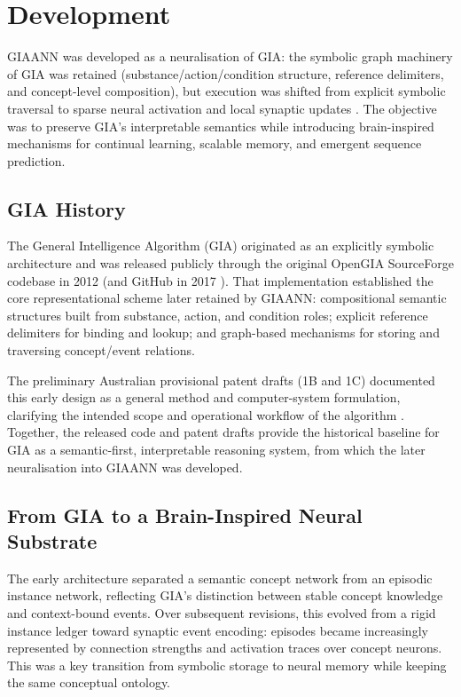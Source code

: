 \section{Development}\label{sec:development}

GIAANN was developed as a neuralisation of GIA: the symbolic graph machinery of GIA was retained
(substance/action/condition structure, reference delimiters, and concept-level composition), but
execution was shifted from explicit symbolic traversal to sparse neural activation and local synaptic
updates \citep{baxterai_gia,bairesearch2017GIA}. The objective was to preserve GIA's interpretable
semantics while introducing brain-inspired mechanisms for continual learning, scalable memory, and
emergent sequence prediction.

\subsection{GIA History}

The General Intelligence Algorithm (GIA) originated as an explicitly symbolic architecture and was
released publicly through the original OpenGIA SourceForge codebase in 2012
\citep{bairesearch2022OpenGIAsourceforge} (and GitHub in 2017 \citep{bairesearch2017GIA}). That implementation established the core representational
scheme later retained by GIAANN: compositional semantic structures built from substance, action, and
condition roles; explicit reference delimiters for binding and lookup; and graph-based mechanisms for
storing and traversing concept/event relations.

The preliminary Australian provisional patent drafts (1B and 1C) documented this early design as a
general method and computer-system formulation, clarifying the intended scope and operational
workflow of the algorithm \citep{bairesearch2022giaPatentAUprovisional1B,bairesearch2022giaPatentAUprovisional1C}.
Together, the released code and patent drafts provide the historical baseline for GIA as a
semantic-first, interpretable reasoning system, from which the later neuralisation into GIAANN was
developed.

\subsection{From GIA to a Brain-Inspired Neural Substrate}

The early architecture separated a semantic concept network from an episodic instance network,
reflecting GIA's distinction between stable concept knowledge and context-bound events. Over
subsequent revisions, this evolved from a rigid instance ledger toward synaptic event encoding:
episodes became increasingly represented by connection strengths and activation traces over concept
neurons. This was a key transition from symbolic storage to neural memory while keeping the same
conceptual ontology.

